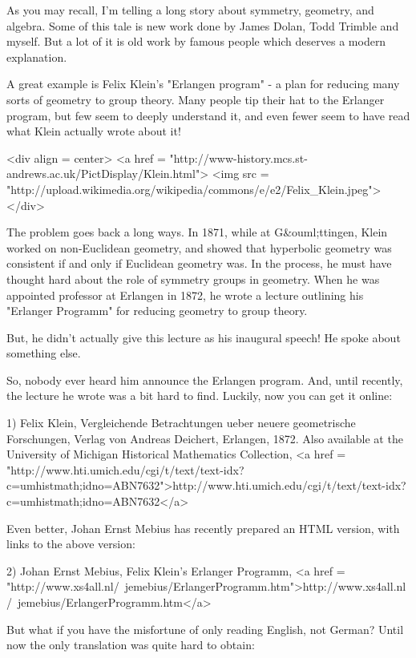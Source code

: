 

As you may recall, I'm telling a long story about symmetry, geometry, 
and algebra.  Some of this tale is new work done by James Dolan, Todd 
Trimble and myself.  But a lot of it is old work by famous people which
deserves a modern explanation. 

A great example is Felix Klein's "Erlangen program" - a plan for
reducing many sorts of geometry to group theory.  Many people tip
their hat to the Erlanger program, but few seem to deeply understand 
it, and even fewer seem to have read what Klein actually wrote about it!   

<div align = center>
<a href = "http://www-history.mcs.st-andrews.ac.uk/PictDisplay/Klein.html">
<img src = "http://upload.wikimedia.org/wikipedia/commons/e/e2/Felix_Klein.jpeg">
</div>

The problem goes back a long ways.  In 1871, while at G&ouml;ttingen, 
Klein worked on non-Euclidean geometry, and showed that hyperbolic
geometry was consistent if and only if Euclidean geometry was.
In the process, he must have thought hard about the role of symmetry
groups in geometry.  When he was appointed professor at Erlangen 
in 1872, he wrote a lecture outlining his "Erlanger Programm" for
reducing geometry to group theory.  

But, he didn't actually give this lecture as his inaugural speech!
He spoke about something else.

So, nobody ever heard him announce the Erlangen program.  And, until
recently, the lecture he wrote was a bit hard to find.  Luckily, now 
you can get it online:

1) Felix Klein, Vergleichende Betrachtungen ueber neuere geometrische 
Forschungen, Verlag von Andreas Deichert, Erlangen, 1872.  Also 
available at the University of Michigan Historical Mathematics Collection, 
<a href = "http://www.hti.umich.edu/cgi/t/text/text-idx?c=umhistmath;idno=ABN7632">http://www.hti.umich.edu/cgi/t/text/text-idx?c=umhistmath;idno=ABN7632</a>

Even better, Johan Ernst Mebius has recently prepared an HTML version,
with links to the above version:

2) Johan Ernst Mebius, Felix Klein's Erlanger Programm,
<a href = "http://www.xs4all.nl/~jemebius/ErlangerProgramm.htm">http://www.xs4all.nl/~jemebius/ErlangerProgramm.htm</a>

But what if you have the misfortune of only reading English, not 
German?  Until now the only translation was quite hard to obtain:

